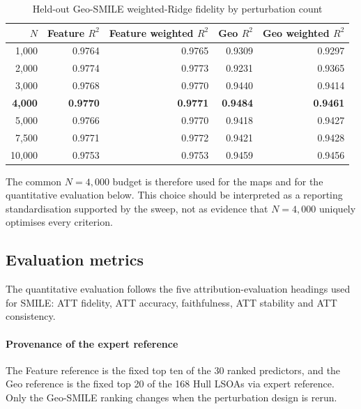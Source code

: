 \begin{table}[H]
\centering
\caption{Held-out Geo-SMILE weighted-Ridge fidelity by perturbation count}
\label{tab:hull_fidelity_by_n}
\small
\begin{tabular}{rrrrr}
\toprule
$N$ & Feature $R^2$ & Feature weighted $R^2$ & Geo $R^2$ & Geo weighted $R^2$ \\
\midrule
1,000 & 0.9764 & 0.9765 & 0.9309 & 0.9297 \\
2,000 & 0.9774 & 0.9773 & 0.9231 & 0.9365 \\
3,000 & 0.9768 & 0.9770 & 0.9440 & 0.9414 \\
\textbf{4,000} & \textbf{0.9770} & \textbf{0.9771} & \textbf{0.9484} & \textbf{0.9461} \\
5,000 & 0.9766 & 0.9770 & 0.9418 & 0.9427 \\
7,500 & 0.9771 & 0.9772 & 0.9421 & 0.9428 \\
10,000 & 0.9753 & 0.9753 & 0.9459 & 0.9456 \\
\bottomrule
\end{tabular}
\end{table}



The common $N=4{,}000$ budget is therefore used for the maps and for the quantitative evaluation below. This choice should be interpreted as a reporting standardisation supported by the sweep, not as evidence that $N=4{,}000$ uniquely optimises every criterion.

\subsection{Evaluation metrics}
\label{sec:hull_quant_results}

The quantitative evaluation follows the five attribution-evaluation headings used for SMILE: ATT fidelity, ATT accuracy, faithfulness, ATT stability and ATT consistency.

\paragraph{Provenance of the expert reference}
\label{sec:hull_ground_truth}

The Feature reference is the fixed top ten of the 30 ranked predictors, and the Geo reference is the fixed top 20 of the 168 Hull LSOAs via expert reference. Only the Geo-SMILE ranking changes when the perturbation design is rerun.

